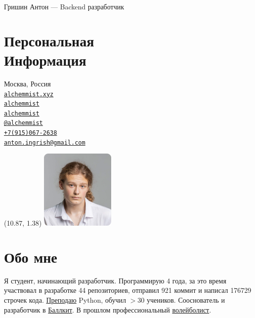 \documentclass[margin,line]{resume}
\begin{document}
{\vspace*{-13mm}\sc \large Гришин Антон — Backend разработчик} \\
\begin{resume}
  \begin{minipage}[t]{0.55\textwidth}
    \section{\mysidestyle Персональная\\Информация}
    Москва, Россия \\
    \faHome  \space
    \href{https://alchemmist.xyz}{\texttt{alchemmist.xyz}} \\
    \faGithub  \space
    \href{https://github.com/alchemmist/}{\texttt{alchemmist}} \\
    \faLinkedin \space
    \href{https://www.linkedin.com/in/alchemmist/}{\texttt{alchemmist}}
    \\
    \faPaperPlane \space \href{https://t.me/alchemmist}{\texttt{@alchemmist}} \\
    \faPhone \space
    \href{tel:+1234567890}{\color{blue}\texttt{+7(915)067-2638}}  \\
    \faEnvelope \space
    \href{mailto:anton.ingrish@gmail.com}{\color{blue}\texttt{anton.ingrish@gmail.com}}
  \end{minipage}

  \begin{minipage}[H]{0.18\textwidth}
    \begin{textblock}{7}(10.87, 1.38)
      \includegraphics[width=0.270\textwidth]{../images/avatar.png}
    \end{textblock}
  \end{minipage}

  \vspace{-7mm}
  \section{\mysidestyle Обо мне}
  Я студент, начинающий разработчик. Программирую 4 года, за
  это время участвовал в разработке 44 репозиториев, отправил 921
  коммит и написал 176729 строчек кода.
  \href{https://www.avito.ru/moskva/predlozheniya_uslug/prepodavatel_programmirovaniya_na_python_2556461612}{Преподаю}
  Python, обучил $> 30$ учеников. Сооснователь и
  разработчик в \href{https://ballkit.ru/}{Баллкит}. В прошлом профессиональный
  \href{https://alchemmist.github.io/CV/attachments/sport.pdf}{волейболист}.


\end{resume}
\end{document}
